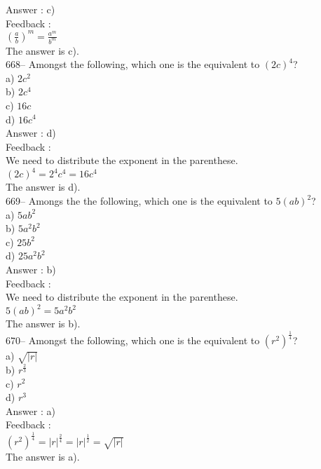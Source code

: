 \documentclass[letterpaper, 12pt]{article}
\begin{document}
Answer : c)\\

Feedback : \\[2mm]
$\left( \frac{a}{b}\right)^{m} =\frac{a^{m}}{b^{m}}$\\[2mm]
The answer is c).\\

668-- Amongst the following, which one is the equivalent to $\left( 2c\right) ^{4}$?\\
a) $2c^{2}$\\
b) $2c^{4}$\\
c) $16c$\\
d) $16c^{4}$\\

Answer : d)\\

Feedback : \\
We need to distribute the exponent in the parenthese.\\
$\left( 2c\right) ^{4}=2^{4}c^{4}=16c^{4}$\\
The answer is d).\\

669-- Amongs the the following, which one is the equivalent to
$5\left( ab\right) ^{2}$?\\
a) $5ab^{2}$\\
b) $5a^{2}b^{2}$\\
c) $25b^{2}$\\
d) $25a^{2}b^{2}$\\

Answer : b)\\

Feedback : \\
We need to distribute the exponent in the parenthese.\\
$5\left( ab\right) ^{2}=5a^{2}b^{2}$\\
The answer is b).\\

670-- Amongst the following, which one is the equivalent to
$\left( r^{2}\right)^\frac{1}{4}$?\\
a) $\sqrt{|r|}$\\
b) $r^{\frac{2}{3}}$\\
c) $r^{2}$\\
d) $r^{3}$\\

Answer : a)\\

Feedback : \\
$\left( r^{2}\right)^\frac{1}{4}=|r|^\frac{2}{4}=|r|^\frac{1}{2}=\sqrt{|r|}$\\
The answer is a).\\
\end{document}
